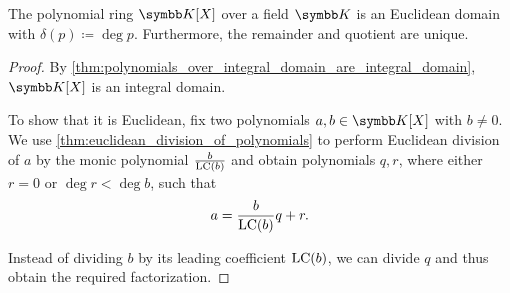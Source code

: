 \begin{corollary}\label{thm:polynomials_over_field_are_euclidean_domain}\cite[10]{Knapp2016BAlg}
  The polynomial ring \( \K[X] \) over a field \( \K \) is an Euclidean domain with \( \delta(p) \coloneqq \deg p \). Furthermore, the remainder and quotient are unique.
\end{corollary}
\begin{proof}
  By \cref{thm:polynomials_over_integral_domain_are_integral_domain}, \( \K[X] \) is an integral domain.

  To show that it is Euclidean, fix two polynomials \( a, b \in \K[X] \) with \( b \neq 0 \). We use \cref{thm:euclidean_division_of_polynomials} to perform Euclidean division of \( a \) by the monic polynomial \( \frac {b} {\operatorname{LC}(b)} \) and obtain polynomials \( q, r \), where either \( r = 0 \) or \( \deg r < \deg b \), such that
  \begin{equation*}
    a = \frac {b} {\operatorname{LC}(b)} q + r.
  \end{equation*}

  Instead of dividing \( b \) by its leading coefficient \( \operatorname{LC}(b) \), we can divide \( q \) and thus obtain the required factorization.
\end{proof}

